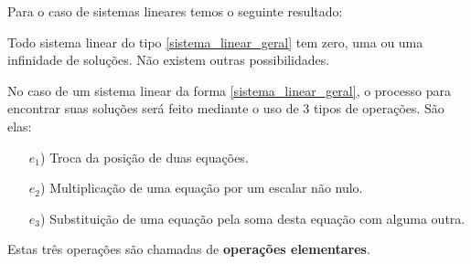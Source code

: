 Para o caso de sistemas lineares temos o seguinte resultado:

\begin{teorema}
    Todo sistema linear do tipo \eqref{sistema_linear_geral} tem zero,  uma  ou uma infinidade de soluções.  Não existem outras possibilidades.
\end{teorema}

No caso de um sistema linear da forma \eqref{sistema_linear_geral},  o processo para encontrar suas soluções ser\'a feito mediante o uso de 3 tipos de opera\c{c}\~oes.  S\~ao elas:
\begin{itemize}
\item[$e_1$)] Troca da posi\c{c}\~ao de duas equa\c{c}\~oes.
\item[$e_2$)] Multiplica\c{c}\~ao de uma equa\c{c}\~ao por um escalar n\~ao nulo.
\item[$e_3$)] Substitui\c{c}\~ao de uma equa\c{c}\~ao pela soma desta equa\c{c}\~ao com alguma outra.
\end{itemize}

Estas tr\^es opera\c{c}\~oes s\~ao chamadas de  \textbf{opera\c{c}\~oes elementares}.

